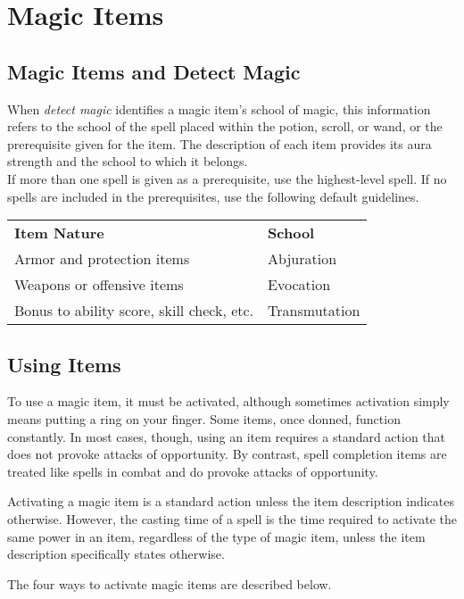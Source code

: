 \chapter{Magic Items}
\section{Magic Items and Detect Magic}

When \textit{detect magic} identifies a magic item's school of magic, this information refers to the school of the spell placed within the potion, scroll, or wand, or the prerequisite given for the item. The description of each item provides its aura strength and the school to which it belongs. \\

If more than one spell is given as a prerequisite, use the highest-level spell. If no spells are included in the prerequisites, use the following default guidelines.\\

\begin{tabular}{ll}
\textbf{Item Nature} & \textbf{School} \\
Armor and protection items & Abjuration\\
Weapons or offensive items & Evocation\\
Bonus to ability score, skill check, etc. & Transmutation\\
\end{tabular}

\section{Using Items}

			
To use a magic item, it must be activated, although sometimes activation simply means putting a ring on your finger. Some items, once donned, function constantly. In most cases, though, using an item requires a standard action that does not provoke attacks of opportunity. By contrast, spell completion items are treated like spells in combat and do provoke attacks of opportunity.
				
Activating a magic item is a standard action unless the item description indicates otherwise. However, the casting time of a spell is the time required to activate the same power in an item, regardless of the type of magic item, unless the item description specifically states otherwise.
				
The four ways to activate magic items are described below.
				
